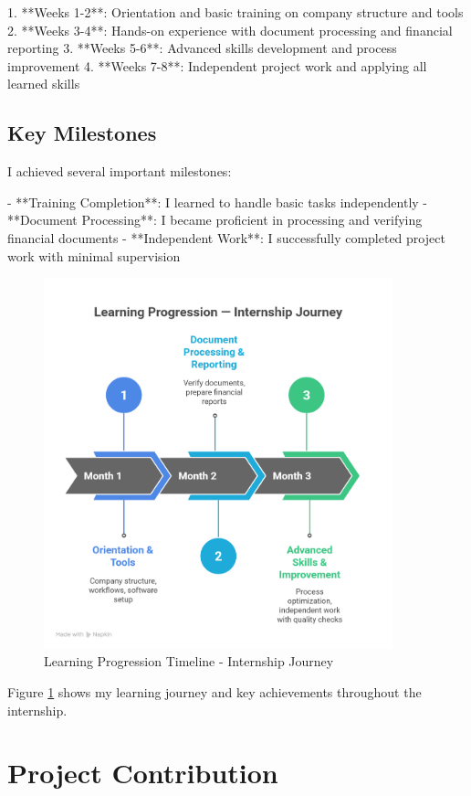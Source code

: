 1. **Weeks 1-2**: Orientation and basic training on company structure and tools
2. **Weeks 3-4**: Hands-on experience with document processing and financial reporting
3. **Weeks 5-6**: Advanced skills development and process improvement
4. **Weeks 7-8**: Independent project work and applying all learned skills

\subsection{Key Milestones}
I achieved several important milestones:

- **Training Completion**: I learned to handle basic tasks independently
- **Document Processing**: I became proficient in processing and verifying financial documents
- **Independent Work**: I successfully completed project work with minimal supervision

\begin{figure}[H]
    \centering
    \includegraphics[width=0.9\textwidth]{assets/images/learning_timeline_chart.png}
    \caption{Learning Progression Timeline - Internship Journey}
    \label{fig:learning_timeline_chart}
\end{figure}

Figure \ref{fig:learning_timeline_chart} shows my learning journey and key achievements throughout the internship.

\section{Project Contribution}

